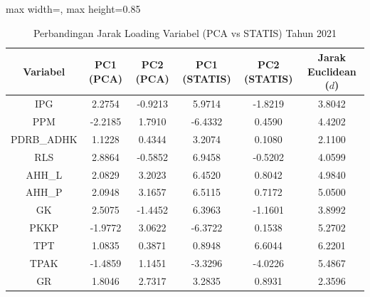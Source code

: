 \begin{table}[H]
\centering
\caption{Perbandingan Jarak Loading Variabel (PCA vs STATIS) Tahun 2021} \label{tab:app1jarak_loading_2021}
\begin{adjustbox}{max width=\textwidth, max height=0.85\textheight}
\begin{tabular}{|c|c|c|c|c|c|}
\hline
\textbf{Variabel} & \textbf{PC1 (PCA)} & \textbf{PC2 (PCA)} & \textbf{PC1 (STATIS)} & \textbf{PC2 (STATIS)} & \textbf{Jarak Euclidean ($d$)} \\
\hline
IPG & 2.2754 & -0.9213 & 5.9714 & -1.8219 & 3.8042 \\
PPM & -2.2185 & 1.7910 & -6.4332 & 0.4590 & 4.4202 \\
PDRB\_ADHK & 1.1228 & 0.4344 & 3.2074 & 0.1080 & 2.1100 \\
RLS & 2.8864 & -0.5852 & 6.9458 & -0.5202 & 4.0599 \\
AHH\_L & 2.0829 & 3.2023 & 6.4520 & 0.8042 & 4.9840 \\
AHH\_P & 2.0948 & 3.1657 & 6.5115 & 0.7172 & 5.0500 \\
GK & 2.5075 & -1.4452 & 6.3963 & -1.1601 & 3.8992 \\
PKKP & -1.9772 & 3.0622 & -6.3722 & 0.1538 & 5.2702 \\
TPT & 1.0835 & 0.3871 & 0.8948 & 6.6044 & 6.2201 \\
TPAK & -1.4859 & 1.1451 & -3.3296 & -4.0226 & 5.4867 \\
GR & 1.8046 & 2.7317 & 3.2835 & 0.8931 & 2.3596 \\
\hline
\end{tabular}
\end{adjustbox}
\end{table}
